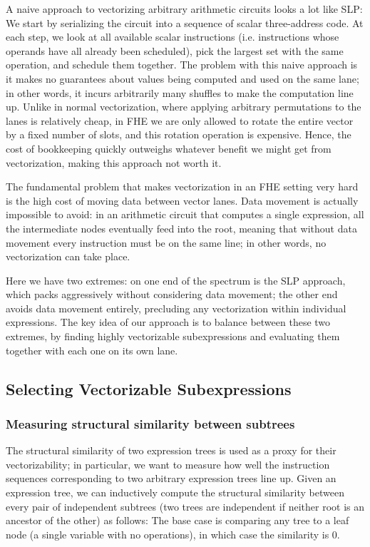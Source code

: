 A naive approach to vectorizing arbitrary arithmetic circuits looks a lot like SLP: We start by serializing the circuit into a sequence of scalar three-address code.
At each step, we look at all available scalar instructions (i.e. instructions whose operands have all already been scheduled), pick the largest set with the same operation, and schedule them together.
The problem with this naive approach is it makes no guarantees about values being computed and used on the same lane; in other words, it incurs arbitrarily many shuffles to make the computation line up. 
Unlike in normal vectorization, where applying arbitrary permutations to the lanes is relatively cheap, in FHE we are only allowed to rotate the entire vector by a fixed number of slots, and this rotation operation is expensive.
Hence, the cost of bookkeeping quickly outweighs whatever benefit we might get from vectorization, making this approach not worth it.

The fundamental problem that makes vectorization in an FHE setting very hard is the high cost of moving data between vector lanes. 
Data movement is actually impossible to avoid: in an arithmetic circuit that computes a single expression, all the intermediate nodes eventually feed into the root, meaning that without data movement every instruction must be on the same line; in other words, no vectorization can take place.

Here we have two extremes: on one end of the spectrum is the SLP approach, which packs aggressively without considering data movement; the other end avoids data movement entirely, precluding any vectorization within individual expressions.
The key idea of our approach is to balance between these two extremes, by finding highly vectorizable subexpressions and evaluating them together with each one on its own lane.

\subsection{Selecting Vectorizable Subexpressions}
\subsubsection*{Measuring structural similarity between subtrees}
The structural similarity of two expression trees is used as a proxy for their vectorizability; in particular, we want to measure how well the instruction sequences corresponding to two arbitrary expression trees line up.
Given an expression tree, we can inductively compute the structural similarity between every pair of independent subtrees (two trees are independent if neither root is an ancestor of the other) as follows:
The base case is comparing any tree to a leaf node (a single variable with no operations), in which case the similarity is $0$.

